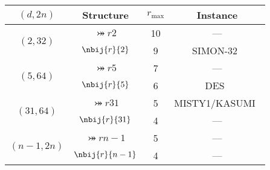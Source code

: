 {
  \renewcommand\arraystretch{1.2}
  \setlength{\tabcolsep}{4pt}

  \begin{table}
      \centering
      \begin{tabular}{cccc}
        \toprule
        $(d,2n)$ & Structure & $r_{\max}$ & Instance \\
        \midrule
        \multirow{2}{*}{$(2, 32)$} & $\bij{r}{2}$ & 10 & --- \\
        & $\nbij{r}{2}$ & 9 & SIMON-32~\cite{Simon} \\
        \hline
        \multirow{2}{*}{$(5, 64)$} & $\bij{r}{5}$ & 7 & --- \\
        & $\nbij{r}{5}$ & 6 & DES~\cite{DES} \\
        \hline
        \multirow{2}{*}{$(31, 64)$} & $\bij{r}{31}$ & 5 & MISTY1/KASUMI~\cite{MISTY1} \\
        & $\nbij{r}{31}$ & 4 & --- \\
        \hline
        \multirow{2}{*}{$(n-1, 2n)$} & $\bij{r}{n-1}$ & 5 & --- \\
        & $\nbij{r}{n-1}$ & 4 & --- \\
        \bottomrule
      \end{tabular}
  \end{table}
}